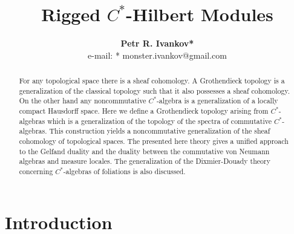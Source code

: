 \documentclass[10]{article}
\title{Rigged $C^*$-Hilbert Modules}
\author
	{\textbf{Petr R. Ivankov*}\\
		e-mail: * monster.ivankov@gmail.com \\
	}
\theoremstyle{plain}
\theoremstyle{definition}
\theoremstyle{definition}
\numberwithin{equation}{section}
\newcommand{\7}{\dagger}                     %
\newcommand{\8}{\bullet}                     %
\renewcommand{\.}{\cdot}                     %
\renewcommand{\:}{\colon}                    %
\renewcommand{\:}{\colon}           %
\begin{document}
		
		\maketitle  %
		\pagestyle{plain}
		
		\begin{abstract}
		For any topological space there is a sheaf cohomology. A Grothendieck topology  is a generalization  of the  classical topology such that  it also possesses a sheaf cohomology. On the other hand any noncommutative $C^*$-algebra is a generalization of a locally compact Hausdorff space. Here we define a Grothendieck topology arising from  $C^*$-algebras which is a generalization of the topology of the spectra of commutative $C^*$-algebras. This construction yields a noncommutative generalization of the sheaf cohomology of topological spaces.  The presented here theory gives a unified approach to  the  Gelfand duality and the duality between the commutative von Neumann algebras and measure locales.  The generalization of the  Dixmier-Douady theory  concerning $C^*$-algebras of foliations is also discussed.  
		
	\end{abstract}
		\section{Introduction}\label{foliations_sec}
	
\end{document}
